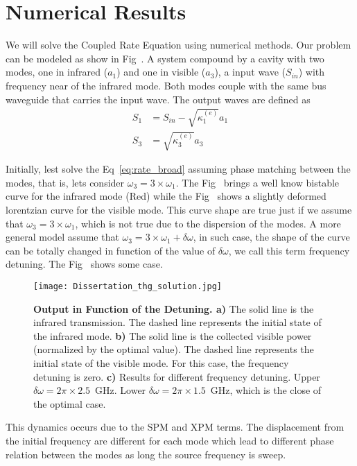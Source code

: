 \section{Numerical Results}

We will solve the Coupled Rate Equation using numerical methods. Our problem can be modeled as show in Fig~. A system compound by a cavity with two modes, one in infrared ($a_1$) and one in visible ($a_3$), a input wave ($S_{in}$) with frequency near of the infrared mode. Both modes couple with the same bus waveguide that carries the input wave. The output waves are defined as 
\begin{subequations}
    \begin{align}
        S_1 &= S_{in} - \sqrt{\kappa^{(e)}_1}a_1\\
        S_3 &= \sqrt{\kappa^{(e)}_3}a_3
    \end{align}
\end{subequations}

Initially, lest solve the Eq~\ref{eq:rate_broad} assuming phase matching between the modes, that is, lets consider $\omega_3 = 3\times\omega_1$. The Fig~
brings a well know bistable curve for the infrared mode (Red) while the Fig~ 
shows a slightly deformed lorentzian curve for the visible mode. This curve shape are true just if we assume that $\omega_3 = 3\times\omega_1$, which is not true due to the dispersion of the modes. A more general model assume that $\omega_3 = 3\times\omega_1 + \delta\omega$, in such case, the shape of the curve can be totally changed in function of the value of $\delta\omega$, we call this term frequency detuning. The Fig~
shows some case. 

\begin{figure}[!h]
    \centering
    \texttt{[image: Dissertation\_thg\_solution.jpg]}
    \caption{\textbf{Output in Function of the Detuning. a)} The solid line is the infrared transmission. The dashed line represents the initial state of the infrared mode. \textbf{b)} The solid line is the collected visible power (normalized by the optimal value). The dashed line represents the initial state of the visible mode. For this case, the frequency detuning is zero. \textbf{c)} Results for different frequency detuning. Upper $\delta\omega = 2\pi\times2.5$~GHz. Lower $\delta\omega = 2\pi\times1.5$~GHz, which is the close of the optimal case.}
    \label{fig:temporal_solution}
\end{figure}
This dynamics occurs due to the SPM and XPM terms. The displacement from the initial frequency are different for each mode which lead to different phase relation between the modes as long the source frequency is sweep. 

